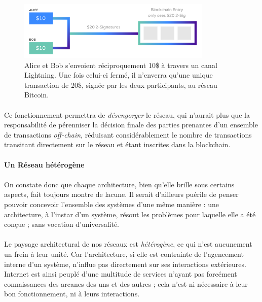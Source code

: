 \begin{figure}[ht]
    \centering
    \includegraphics[width=350px]{chapters/02/images/lightning_network.png}
    \caption{\label{lightning_network}Alice et Bob s'envoient réciproquement 10\$ à travers un canal Lightning. Une fois
    celui-ci fermé, il n'enverra qu'une unique transaction de 20\$, signée par les deux participants, au réseau Bitcoin.}
\end{figure}

\paragraph{} Ce fonctionnement permettra de \emph{désengorger} le réseau, qui n'aurait plus que la responsabilité de pérenniser
la décision finale des parties prenantes d'un ensemble de transactions \emph{off-chain}, réduisant considérablement le nombre
de transactions transitant directement sur le réseau et étant inscrites dans la blockchain.


\paragraph{Un Réseau hétérogène}

\paragraph{} On constate donc que chaque architecture, bien qu'elle brille sous certains aspects, fait toujours montre de
lacune. Il serait d'ailleurs puérile de penser pouvoir concevoir l'ensemble des systèmes d'une même manière : une architecture,
à l'instar d'un système, résout les problèmes pour laquelle elle a été conçue ; sans vocation d'universalité.

\paragraph{} Le paysage architectural de nos réseaux est \emph{hétérogène}, ce qui n'est aucunement un frein à leur unité.
Car l'architecture, si elle est contrainte de l'agencement interne d'un système, n'influe pas directement sur ses interactions
extérieures. Internet est ainsi peuplé d'une multitude de services n'ayant pas forcément connaissances des arcanes des uns et
des autres ; cela n'est ni nécessaire à leur bon fonctionnement, ni à leurs interactions.